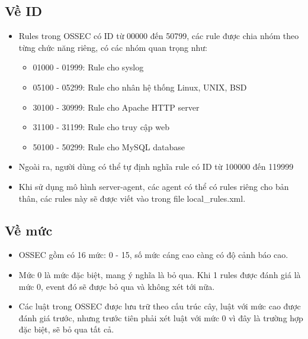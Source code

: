   \subsection{ Về ID}
  \begin{itemize}
    \item Rules trong OSSEC có ID từ 00000 đến 50799, các rule được chia nhóm
    theo từng chức năng riêng, có các nhóm quan trọng như:
    \begin{itemize}
      \item 01000 - 01999: Rule cho syslog
      \item 05100 - 05299: Rule cho nhân hệ thống Linux, UNIX, BSD
      \item 30100 - 30999: Rule cho Apache HTTP server
      \item 31100 - 31199: Rule cho truy cập web 
      \item 50100 - 50299: Rule cho MySQL database
      \end{itemize}
      \item Ngoài ra, người dùng có thể tự định nghĩa rule có ID từ 100000 đến
      119999
      \item Khi sử dụng mô hình server-agent, các agent có thể có rules riêng
      cho bản thân, các rules này sẽ được viết vào trong file local\_rules.xml.
  \end{itemize}
  \subsection{Về mức}
  \begin{itemize}
    \item OSSEC gồm có 16 mức: 0 - 15, số mức cáng cao càng có độ cảnh báo cao.
    \item Mức 0 là mức đặc biệt, mang ý nghĩa là bỏ qua. Khi 1 rules được đánh
    giá là mức 0, event đó sẽ được bỏ qua và không xét tới nữa.
    \item Các luật trong OSSEC được lưu trữ theo cấu trúc cây, luật với mức cao
    được đánh giá trước, nhưng trước tiên phải xét luật với mức 0 vì đây là trường hợp đặc biệt, sẽ bỏ qua tất cả.
  \end{itemize}
